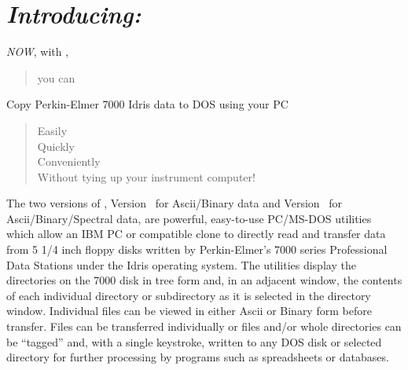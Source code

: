 \pagestyle{empty} 



 



\section*{{\sl Introducing: \RD}} 
{\sl NOW}, with \RD,
\begin{quote}
	you can
\end{quote}
Copy Perkin-Elmer 7000 Idris data to DOS using your PC
\begin{quote}
	Easily\\
	Quickly\\
	Conveniently\\
	Without tying up your instrument computer!
\end{quote}
 
The two versions of \RD, Version \AB\ for Ascii/Binary data and
Version \SP\ for Ascii/Binary/Spectral data, are powerful, easy-to-use
PC/MS-DOS utilities which allow an IBM PC or compatible clone to
directly read and transfer data from 5 1/4 inch floppy disks written
by Perkin-Elmer's 7000 series Professional Data Stations under the
Idris operating system.  The utilities display the directories on the
7000 disk in tree form and, in an adjacent window, the contents of
each individual directory or subdirectory as it is selected in the
directory window.  Individual files can be viewed in either Ascii or
Binary form before transfer.  Files can be transferred individually or
files and/or whole directories can be ``tagged'' and, with a single
keystroke, written to any DOS disk or selected directory for further
processing by programs such as spreadsheets or databases.
 
